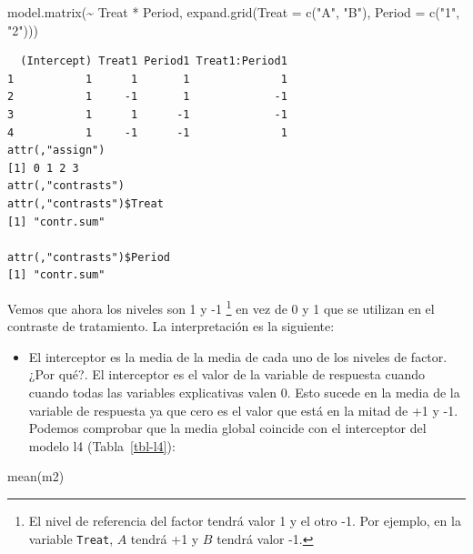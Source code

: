 \documentclass[
  12pt,
  a4paper,
  extrafontsizes,
  onecolumn,
  openright,
  table]{memoir}
\newenvironment{Shaded}{\begin{snugshade}}{\end{snugshade}}
\newcommand{\AttributeTok}[1]{\textcolor[rgb]{0.40,0.45,0.13}{#1}}
\newcommand{\FunctionTok}[1]{\textcolor[rgb]{0.28,0.35,0.67}{#1}}
\newcommand{\NormalTok}[1]{\textcolor[rgb]{0.00,0.23,0.31}{#1}}
\newcommand{\SpecialCharTok}[1]{\textcolor[rgb]{0.37,0.37,0.37}{#1}}
\newcommand{\StringTok}[1]{\textcolor[rgb]{0.13,0.47,0.30}{#1}}
\providecommand{\tightlist}{%
  \setlength{\itemsep}{0pt}\setlength{\parskip}{0pt}}\usepackage{longtable,booktabs,array}
\begin{document}
\scriptsize

\begin{Shaded}
\begin{Highlighting}[]
\FunctionTok{model.matrix}\NormalTok{(}\SpecialCharTok{\textasciitilde{}}\NormalTok{ Treat }\SpecialCharTok{*}\NormalTok{ Period, }\FunctionTok{expand.grid}\NormalTok{(}\AttributeTok{Treat =} \FunctionTok{c}\NormalTok{(}\StringTok{"A"}\NormalTok{, }\StringTok{"B"}\NormalTok{), }\AttributeTok{Period =} \FunctionTok{c}\NormalTok{(}\StringTok{"1"}\NormalTok{, }\StringTok{"2"}\NormalTok{)))}
\end{Highlighting}
\end{Shaded}

\begin{verbatim}
  (Intercept) Treat1 Period1 Treat1:Period1
1           1      1       1              1
2           1     -1       1             -1
3           1      1      -1             -1
4           1     -1      -1              1
attr(,"assign")
[1] 0 1 2 3
attr(,"contrasts")
attr(,"contrasts")$Treat
[1] "contr.sum"

attr(,"contrasts")$Period
[1] "contr.sum"
\end{verbatim}

\normalsize

Vemos que ahora los niveles son 1 y -1 \footnote{El nivel de referencia
  del factor tendrá valor 1 y el otro -1. Por ejemplo, en la variable
  \texttt{Treat}, \(A\) tendrá +1 y \(B\) tendrá valor -1.} en vez de 0
y 1 que se utilizan en el contraste de tratamiento. La interpretación es
la siguiente:

\begin{itemize}
\tightlist
\item
  El interceptor es la media de la media de cada uno de los niveles de
  factor. ¿Por qué?. El interceptor es el valor de la variable de
  respuesta cuando cuando todas las variables explicativas valen 0. Esto
  sucede en la media de la variable de respuesta ya que cero es el valor
  que está en la mitad de +1 y -1. Podemos comprobar que la media global
  coincide con el interceptor del modelo l4 (Tabla~\ref{tbl-l4}):
\end{itemize}

\scriptsize

\begin{Shaded}
\begin{Highlighting}[]
\FunctionTok{mean}\NormalTok{(m2)}
\end{Highlighting}
\end{Shaded}
\end{document}
